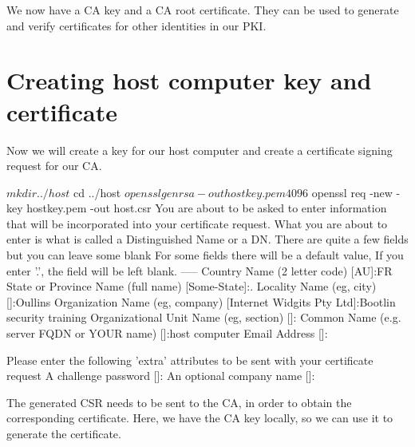 We now have a CA key and a CA root certificate.
They can be used to generate and verify certificates for other identities in our
PKI.

\section{Creating host computer key and certificate}

Now we will create a key for our host computer and create a certificate signing
request for our CA.

\begin{bashinput}
$ mkdir ../host
$ cd ../host
$ openssl genrsa -out hostkey.pem 4096
$ openssl req -new -key hostkey.pem -out host.csr
You are about to be asked to enter information that will be incorporated
into your certificate request.
What you are about to enter is what is called a Distinguished Name or a DN.
There are quite a few fields but you can leave some blank
For some fields there will be a default value,
If you enter '.', the field will be left blank.
-----
Country Name (2 letter code) [AU]:FR
State or Province Name (full name) [Some-State]:.
Locality Name (eg, city) []:Oullins
Organization Name (eg, company) [Internet Widgits Pty Ltd]:Bootlin security training
Organizational Unit Name (eg, section) []:
Common Name (e.g. server FQDN or YOUR name) []:host computer
Email Address []:

Please enter the following 'extra' attributes
to be sent with your certificate request
A challenge password []:
An optional company name []:
\end{bashinput}

The generated CSR needs to be sent to the CA, in order to obtain the
corresponding certificate.
Here, we have the CA key locally, so we can use it to generate the certificate.


